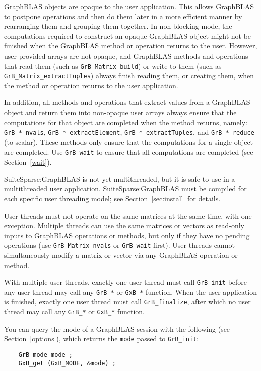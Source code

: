 \documentclass[12pt]{article}
\begin{document}
GraphBLAS objects are opaque to the user application.  This allows GraphBLAS to
postpone operations and then do them later in a more efficient manner by
rearranging them and grouping them together.  In non-blocking mode, the
computations required to construct an opaque GraphBLAS object might not be
finished when the GraphBLAS method or operation returns to the user.  However,
user-provided arrays are not opaque, and GraphBLAS methods and operations that
read them (such as \verb'GrB_Matrix_build') or write to them (such as
\verb'GrB_Matrix_extractTuples') always finish reading them, or creating them,
when the method or operation returns to the user application.

In addition, all methods and operations that extract values from a GraphBLAS
object and return them into non-opaque user arrays always ensure that the
computations for that object are completed when the method returns, namely:
\verb'GrB_*_nvals', \verb'GrB_*_extractElement', \verb'GrB_*_extractTuples',
and \verb'GrB_*_reduce' (to scalar).  These methods only ensure that the
computations for a single object are completed.  Use \verb'GrB_wait'
to ensure that all computations are completed (see Section~\ref{wait}).

SuiteSparse:GraphBLAS is not yet multithreaded, but it is safe to use in a
multithreaded user application.  SuiteSparse:GraphBLAS must be compiled for
each specific user threading model; see Section~\ref{sec:install} for details.

User threads must not operate on the same matrices at the same time, with one
exception.  Multiple threads can use the same matrices or vectors as read-only
inputs to GraphBLAS operations or methods, but only if they have no pending
operations (use \verb'GrB_Matrix_nvals' or \verb'GrB_wait' first).  User
threads cannot simultaneously modify a matrix or vector via any GraphBLAS
operation or method.

With multiple user threads, exactly one user thread must call \verb'GrB_init'
before any user thread may call any \verb'GrB_*' or \verb'GxB_*' function.
When the user application is finished, exactly one user thread
must call \verb'GrB_finalize', after which no user thread may call
any \verb'GrB_*' or \verb'GxB_*' function.

You can query the mode of a GraphBLAS session with the following
(see Section~\ref{options}), which returns the \verb'mode' passed to
\verb'GrB_init':

{\footnotesize
\begin{verbatim}
    GrB_mode mode ;
    GxB_get (GxB_MODE, &mode) ; \end{verbatim} }
\end{document}
